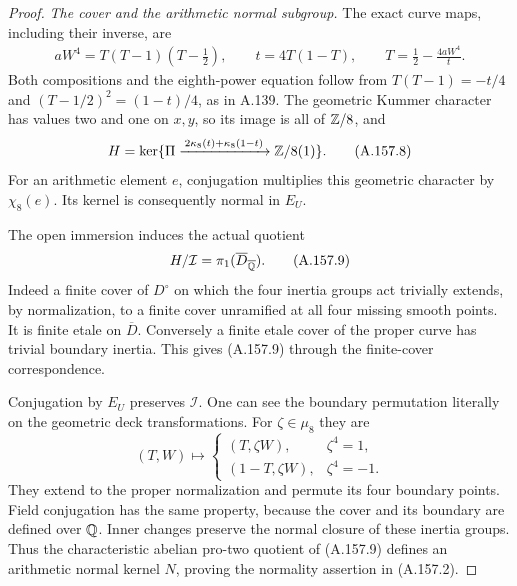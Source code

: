 \begin{proof}
\emph{The cover and the arithmetic normal subgroup.}
The exact curve maps, including their inverse, are
\[
 \begin{gathered}
 aW^4=T(T-1)(T-\tfrac12),\qquad
 t=4T(1-T),\qquad
 T=\tfrac12-\frac{4aW^4}{t}.
 \end{gathered}
\tag{A.157.7}
\]
Both compositions and the eighth-power equation follow
from \(T(T-1)=-t/4\) and
\((T-1/2)^2=(1-t)/4\), as in A.139.
The geometric Kummer character has values two and one
on \(x,y\), so its image is all of \(\mathbb Z/8\), and
\[
 H=\ker\{\Pi\xrightarrow{\,2\kappa_8(t)+\kappa_8(1-t)\,}
                                      \mathbb Z/8(1)\}.
\tag{A.157.8}
\]
For an arithmetic element \(e\), conjugation multiplies
this geometric character by \(\chi_8(e)\).
Its kernel is consequently normal in \(E_U\).

The open immersion induces the actual quotient
\[
 H/\mathcal I=\pi_1(\overline D_{\overline{\mathbb Q}}).
\tag{A.157.9}
\]
Indeed a finite cover of \(D^\circ\) on which the
four inertia groups act trivially extends, by normalization,
to a finite cover unramified at all four missing smooth
points.  It is finite etale on \(\overline D\).
Conversely a finite etale cover of the proper curve has
trivial boundary inertia.  This gives (A.157.9) through
the finite-cover correspondence.

Conjugation by \(E_U\) preserves \(\mathcal I\).
One can see the boundary permutation literally on the
geometric deck transformations.  For \(\zeta\in\mu_8\)
they are
\[
 (T,W)\longmapsto
 \begin{cases}(T,\zeta W),&\zeta^4=1,\\
               (1-T,\zeta W),&\zeta^4=-1.
 \end{cases}
\tag{A.157.10}
\]
They extend to the proper normalization and permute
its four boundary points.  Field conjugation has the
same property, because the cover and its boundary are
defined over \(\mathbb Q\).  Inner changes preserve the
normal closure of these inertia groups.  Thus the
characteristic abelian pro-two quotient of (A.157.9)
defines an arithmetic normal kernel \(N\), proving
the normality assertion in (A.157.2).


\end{proof}
